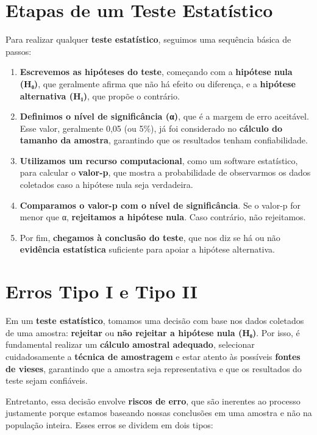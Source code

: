 \documentclass[
]{book}
\begin{document}
\section{Etapas de um Teste Estatístico}\label{etapas-de-um-teste-estatuxedstico}

Para realizar qualquer \textbf{teste estatístico}, seguimos uma sequência básica de passos:

\begin{enumerate}
\def\labelenumi{\arabic{enumi}.}
\item
  \textbf{Escrevemos as hipóteses do teste}, começando com a \textbf{hipótese nula (H₀)}, que geralmente afirma que não há efeito ou diferença, e a \textbf{hipótese alternativa (H₁)}, que propõe o contrário.
\item
  \textbf{Definimos o nível de significância (α)}, que é a margem de erro aceitável. Esse valor, geralmente 0,05 (ou 5\%), já foi considerado no \textbf{cálculo do tamanho da amostra}, garantindo que os resultados tenham confiabilidade.
\item
  \textbf{Utilizamos um recurso computacional}, como um software estatístico, para calcular o \textbf{valor-p}, que mostra a probabilidade de observarmos os dados coletados caso a hipótese nula seja verdadeira.
\item
  \textbf{Comparamos o valor-p com o nível de significância}. Se o valor-p for menor que α, \textbf{rejeitamos a hipótese nula}. Caso contrário, não rejeitamos.
\item
  Por fim, \textbf{chegamos à conclusão do teste}, que nos diz se há ou não \textbf{evidência estatística} suficiente para apoiar a hipótese alternativa.
\end{enumerate}

\section{Erros Tipo I e Tipo II}\label{erros-tipo-i-e-tipo-ii}

Em um \textbf{teste estatístico}, tomamos uma decisão com base nos dados coletados de uma amostra: \textbf{rejeitar} ou \textbf{não rejeitar a hipótese nula (H₀)}. Por isso, é fundamental realizar um \textbf{cálculo amostral adequado}, selecionar cuidadosamente a \textbf{técnica de amostragem} e estar atento às possíveis \textbf{fontes de vieses}, garantindo que a amostra seja representativa e que os resultados do teste sejam confiáveis.

Entretanto, essa decisão envolve \textbf{riscos de erro}, que são inerentes ao processo justamente porque estamos baseando nossas conclusões em uma amostra e não na população inteira. Esses erros se dividem em dois tipos:
\end{document}
